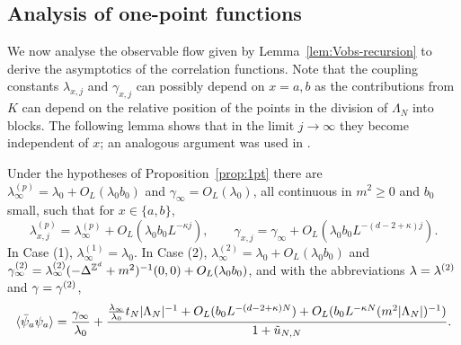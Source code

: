 \documentclass[11pt]{amsart}
\numberwithin{equation}{section}
\numberwithin{theorem}{section}
\newcommand{\1}{{\bf 1}}
\newcommand{\OL}{O_L}
\begin{document}
\subsection{Analysis of one-point functions}

We now analyse the observable flow given by Lemma~\ref{lem:Vobs-recursion} to derive the asymptotics of the correlation functions.
Note that the coupling constants $\lambda_{x,j}$ and $\gamma_{x,j}$ can possibly
depend on $x=a,b$
as the contributions from $K$ can depend on the relative position of the points in the division of $\Lambda_N$
into blocks.
The following lemma shows that in the limit $j\to\infty$ they become
independent of $x$;
an analogous argument was used in \cite[Lemma~4.6]{MR3345374}.

\begin{lemma} \label{lem:1pt}
Under the hypotheses of Proposition~\ref{prop:1pt} there are
$\lambda_\infty^{(p)} = \lambda_0 +
\OL(\lambda_0b_0)$ and $\gamma_\infty= \OL(\lambda_0)$, all
continuous in $m^{2}\geq 0$ and $b_{0}$ small,
such that for $x\in\{a,b\}$,
\begin{equation} \label{e:gammainfbd}
  \lambda_{x,j}^{(p)} = \lambda_\infty^{(p)} + \OL(\lambda_0 b_0 L^{-\kappa j}),\qquad
  \gamma_{x,j}=\gamma_\infty + \OL(\lambda_0 b_0 L^{-(d-2+\kappa)j}).
\end{equation}
In Case (1), $\lambda_\infty^{(1)} = \lambda_0$.  In Case (2),
$\lambda_\infty^{(2)} = \lambda_0 + \OL(\lambda_0b_0)$ and
$\gamma_\infty^{(2)} =
\lambda_\infty^{(2)}(-\Delta^{\Z^d}+m^2)^{-1}(0,0)+
\OL(\lambda_0b_0)$, and with the abbreviations
$\lambda= \lambda^{(2)}$ and $\gamma= \gamma^{(2)}$,
\begin{equation} \label{e:2ptaa}
    \avg{\bar\psi_a\psi_a} =
    \frac{\gamma_\infty}{\lambda_0}
    + \frac{
      \frac{\lambda_{\infty}}{\lambda_0} t_N |\Lambda_N|^{-1}
    + \OL(b_0L^{-(d-2+\kappa)N}) + \OL(b_0L^{-\kappa N}(m^{2}|\Lambda_N|)^{-1})
  }{1+\tilde u_{N,N}}
  .
\end{equation}
\end{lemma}
\end{document}
